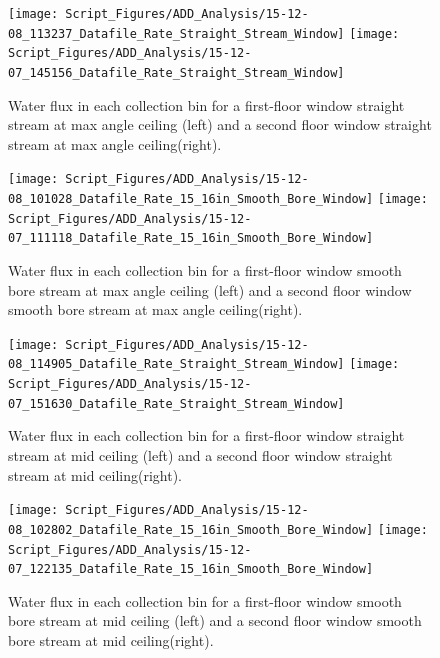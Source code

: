 \documentclass[12pt,oneside]{book}
\begin{document}
\begin{figure}[ht]
\texttt{[image: Script\_Figures/ADD\_Analysis/15-12-08\_113237\_Datafile\_Rate\_Straight\_Stream\_Window]}
\texttt{[image: Script\_Figures/ADD\_Analysis/15-12-07\_145156\_Datafile\_Rate\_Straight\_Stream\_Window]} \\ 
\caption[Water Flux for Straight Stream Max Angle Varying Window Floor]{Water flux in each collection bin for a first-floor window straight stream at max angle ceiling (left) and a second floor window straight stream at max angle ceiling(right).}
\label{fig:Window_First_Floor_Second_Floor_SS_Max}
\end{figure}

\begin{figure}[ht]
\texttt{[image: Script\_Figures/ADD\_Analysis/15-12-08\_101028\_Datafile\_Rate\_15\_16in\_Smooth\_Bore\_Window]}
\texttt{[image: Script\_Figures/ADD\_Analysis/15-12-07\_111118\_Datafile\_Rate\_15\_16in\_Smooth\_Bore\_Window]} \\ 
\caption[Water Flux for Smooth Bore Max Angle Varying Window Floor]{Water flux in each collection bin for a first-floor window smooth bore stream at max angle ceiling (left) and a second floor window smooth bore stream at max angle ceiling(right).}
\label{fig:Window_First_Floor_Second_Floor_SB_Max}
\end{figure}

\begin{figure}[ht]
\texttt{[image: Script\_Figures/ADD\_Analysis/15-12-08\_114905\_Datafile\_Rate\_Straight\_Stream\_Window]}
\texttt{[image: Script\_Figures/ADD\_Analysis/15-12-07\_151630\_Datafile\_Rate\_Straight\_Stream\_Window]} \\ 
\caption[Water Flux for Straight Stream Mid Ceiling Varying Window Floor]{Water flux in each collection bin for a first-floor window straight stream at mid ceiling (left) and a second floor window straight stream at mid ceiling(right).}
\label{fig:Window_First_Floor_Second_Floor_SS_Mid}
\end{figure}

\begin{figure}[ht]
\texttt{[image: Script\_Figures/ADD\_Analysis/15-12-08\_102802\_Datafile\_Rate\_15\_16in\_Smooth\_Bore\_Window]}
\texttt{[image: Script\_Figures/ADD\_Analysis/15-12-07\_122135\_Datafile\_Rate\_15\_16in\_Smooth\_Bore\_Window]} \\ 
\caption[Water Flux for Smooth Bore Mid Ceiling Varying Window Floor]{Water flux in each collection bin for a first-floor window smooth bore stream at mid ceiling (left) and a second floor window smooth bore stream at mid ceiling(right).}
\label{fig:Window_First_Floor_Second_Floor_SB_Mid}
\end{figure}
\end{document}
